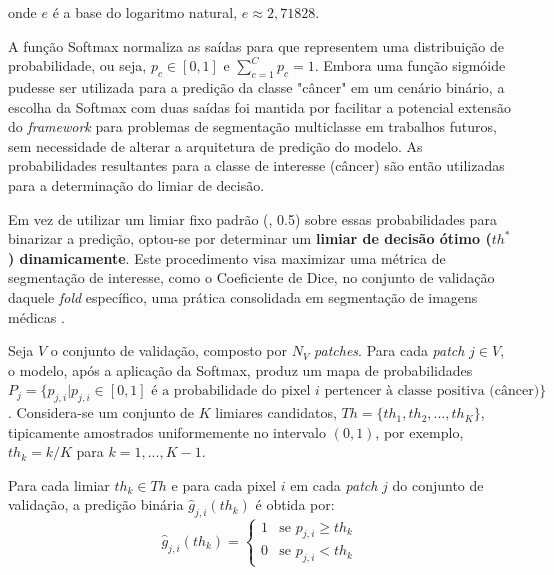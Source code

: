 onde \( e \) é a base do logaritmo natural, \( e \approx 2{,}71828 \).

A função Softmax normaliza as saídas para que representem uma distribuição de probabilidade, ou seja, $p_c \in [0,1]$ e $\sum_{c=1}^{C} p_c = 1$. Embora uma função sigmóide \cite{Bishop2006} pudesse ser utilizada para a predição da classe "câncer" em um cenário binário, a escolha da Softmax com duas saídas foi mantida por facilitar a potencial extensão do \textit{framework} para problemas de segmentação multiclasse em trabalhos futuros, sem necessidade de alterar a arquitetura de predição do modelo. As probabilidades resultantes para a classe de interesse (câncer) são então utilizadas para a determinação do limiar de decisão.

Em vez de utilizar um limiar fixo padrão (\eg, 0.5) sobre essas probabilidades para binarizar a predição, optou-se por determinar um \textbf{limiar de decisão ótimo ($th^*$) dinamicamente}. Este procedimento visa maximizar uma métrica de segmentação de interesse, como o Coeficiente de Dice, no conjunto de validação daquele \textit{fold} específico, uma prática consolidada em segmentação de imagens médicas \cite{Isensee2021, Sudre2017, Taha2015}.

Seja $V$ o conjunto de validação, composto por $N_V$ \textit{patches}. Para cada \textit{patch} $j \in V$, o modelo, após a aplicação da Softmax, produz um mapa de probabilidades $P_j = \{p_{j,i} | p_{j,i} \in [0,1] \text{ é a probabilidade do pixel } i \text{ pertencer à classe positiva (câncer)}\}$.
Considera-se um conjunto de $K$ limiares candidatos, $Th = \{th_1, th_2, ..., th_K\}$, tipicamente amostrados uniformemente no intervalo $(0,1)$, por exemplo, $th_k = k/K$ para $k=1, ..., K-1$.

Para cada limiar $th_k \in Th$ e para cada pixel $i$ em cada \textit{patch} $j$ do conjunto de validação, a predição binária $\hat{g}_{j,i}(th_k)$ é obtida por:
\begin{equation}\label{eq:binarizacao_threshold} %
    \hat{g}_{j,i}(th_k) = \begin{cases} 
      1 & \text{se } p_{j,i} \geq th_k \\
      0 & \text{se } p_{j,i} < th_k 
   \end{cases}
\end{equation}

